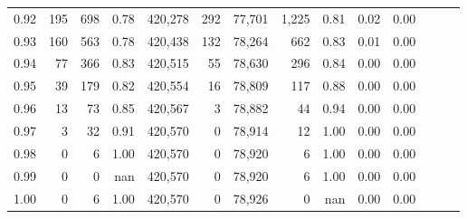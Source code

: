 \begin{tabular}{rrrrrrrrrrrrrr}
0.92 &    195 &    698 &  0.78 &  420,278 &      292 &  77,701 &   1,225 &  0.81 &  0.02 &      0.00 \\
0.93 &    160 &    563 &  0.78 &  420,438 &      132 &  78,264 &     662 &  0.83 &  0.01 &      0.00 \\
0.94 &     77 &    366 &  0.83 &  420,515 &       55 &  78,630 &     296 &  0.84 &  0.00 &      0.00 \\
0.95 &     39 &    179 &  0.82 &  420,554 &       16 &  78,809 &     117 &  0.88 &  0.00 &      0.00 \\
0.96 &     13 &     73 &  0.85 &  420,567 &        3 &  78,882 &      44 &  0.94 &  0.00 &      0.00 \\
0.97 &      3 &     32 &  0.91 &  420,570 &        0 &  78,914 &      12 &  1.00 &  0.00 &      0.00 \\
0.98 &      0 &      6 &  1.00 &  420,570 &        0 &  78,920 &       6 &  1.00 &  0.00 &      0.00 \\
0.99 &      0 &      0 &   nan &  420,570 &        0 &  78,920 &       6 &  1.00 &  0.00 &      0.00 \\
1.00 &      0 &      6 &  1.00 &  420,570 &        0 &  78,926 &       0 &   nan &  0.00 &      0.00 \\
\bottomrule
\end{tabular}
